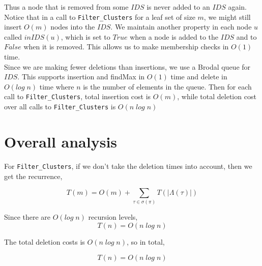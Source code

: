 \documentclass{article}
\begin{document}
    Thus a node that is removed from some $IDS$ is never added to an $IDS$ again. Notice that in a call to \texttt{Filter\_Clusters} for a leaf set of size $m$, we might still insert $O(m)$ nodes into the $IDS$. We maintain another property in each node $u$ called $inIDS(u)$, which is set to $True$ when a node is added to the $IDS$ and to $False$ when it is removed. This allows us to make membership checks in $O(1)$ time.\\

    Since we are making fewer deletions than insertions, we use a Brodal queue for $IDS$. This supports insertion and findMax in $O(1)$ time and delete in $O(log\;n)$ time where $n$ is the number of elements in the queue. Then for each call to \texttt{Filter\_Clusters}, total insertion cost is $O(m)$, while total deletion cost over all calls to \texttt{Filter\_Clusters} is $O(n\;log\;n)$

    \section{Overall analysis}

    For \texttt{Filter\_Clusters}, if we don't take the deletion times into account, then we get the recurrence,

    \[T(m) = O(m) + \sum_{\tau\in\sigma(\pi)}T(|\Lambda(\tau)|)\]

    Since there are $O(log\;n)$ recursion levels,
    \[T(n) = O(n\;log\;n)\]

    The total deletion costs is $O(n\;log\;n)$, so in total,

    \[T(n) = O(n\;log\;n)\]
\end{document}
